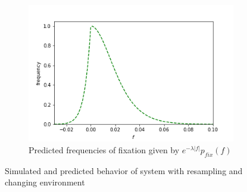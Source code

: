 \documentclass{article}
\begin{document}
\begin{figure}[h]
\begin{subfigure}[t]{0.32\linewidth}
		\centering
		\includegraphics[width = 1.0\linewidth, trim={0 0 0 0}, clip=true]{figures/no_n_combined_dists.png}
		\caption{Predicted frequencies of fixation given by $e^{-\lambda |f|} p_{fix}(f)$}
		\label{fig:changing_resample_predict}
	\end{subfigure}
\caption{Simulated and predicted behavior of system with resampling and changing environment}
\label{fig:changing_resample}
\end{figure}
\end{document}
